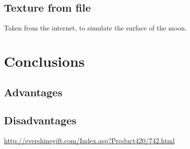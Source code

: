\documentclass[12pt,a4paper]{article}
\begin{document}
\subsection{Texture from file}
Taken from the internet, to simulate the surface of the moon.
\section{Conclusions}
\subsection{Advantages}
%
\subsection{Disadvantages}


\begin{thebibliography}{1}

   \url{http://evershinegift.com/Index.asp?Product420/742.html}

\end{thebibliography}
\end{document}
